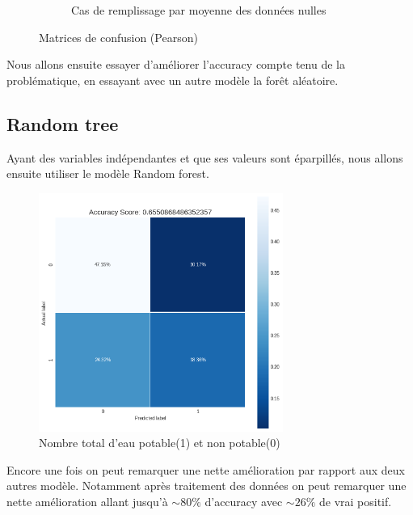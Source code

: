 \documentclass[12pt, a4paper]{article}
\begin{document}
\begin{figure}[H]
\begin{subfigure}[b]{6.75cm}
           \caption{Cas de remplissage par moyenne des données nulles}
            \label{fig:decTree_corr_matrix_mean}
     \end{subfigure}
    \caption{Matrices de confusion (Pearson)}
    \label{fig:mat_conf_decTree}
    \end{figure}
    
    Nous allons ensuite essayer d'améliorer l'accuracy compte tenu de la problématique, en essayant avec un autre modèle la forêt aléatoire.  
    
    \subsection{Random tree}
    Ayant des variables indépendantes et que ses valeurs sont éparpillés, nous allons ensuite utiliser le modèle Random forest. 
    \begin{figure}[H]
           \centering
           \includegraphics[width=8cm]{images/confusion_matrix_randTree_case0.png}
           \caption{Nombre total d'eau potable(1) et non potable(0)}
            \label{fig:randtree_0}
    \end{figure}
    
    Encore une fois on peut remarquer une nette amélioration par rapport aux deux autres modèle. Notamment après traitement des données on peut remarquer une nette amélioration allant jusqu'à $\sim 80\%$ d'accuracy avec $\sim 26\%$ de vrai positif.
    
\end{document}
